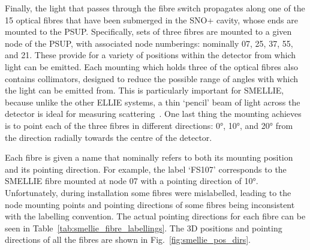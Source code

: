 Finally, the light that passes through the fibre switch propagates along one of the 15 optical fibres that have been submerged in the SNO+ cavity, whose ends are mounted to the PSUP. Specifically, sets of three fibres are mounted to a given node of the PSUP, with associated node numberings: nominally 07, 25, 37, 55, and 21. These provide for a variety of positions within the detector from which light can be emitted. Each mounting which holds three of the optical fibres also contains collimators, designed to reduce the possible range of angles with which the light can be emitted from. This is particularly important for SMELLIE, because unlike the other ELLIE systems, a thin `pencil' beam of light across the detector is ideal for measuring scattering~\cite{majumdarMeasurementOpticalScattering2015}. %
One last thing the mounting achieves is to point each of the three fibres in different directions: \ang{0}, \ang{10}, and \ang{20} from the direction radially towards the centre of the detector.

Each fibre is given a name that nominally refers to both its mounting position and its pointing direction. For example, the label `FS107' corresponds to the SMELLIE fibre mounted at node 07 with a pointing direction of \ang{10}. Unfortunately, during installation some fibres were mislabelled, leading to the node mounting points and pointing directions of some fibres being inconsistent with the labelling convention. The actual pointing directions for each fibre can be seen in Table~\ref{tab:smellie_fibre_labellings}.
The 3D positions and pointing directions of all the fibres are shown in Fig.~\ref{fig:smellie_pos_dirs}.

